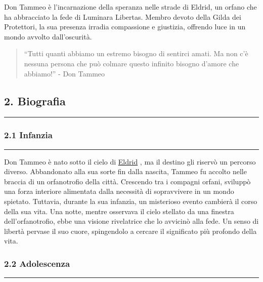 Don Tammeo è l'incarnazione della speranza nelle strade di Eldrid, un
orfano che ha abbracciato la fede di Luminara Libertas. Membro devoto
della Gilda dei Protettori, la sua presenza irradia compassione e
giustizia, offrendo luce in un mondo avvolto dall'oscurità.

\begin{quote}
``Tutti quanti abbiamo un estremo bisogno di sentirci amati. Ma non c'è
nessuna persona che può colmare questo infinito bisogno d'amore che
abbiamo!'' - Don Tammeo
\end{quote}

\subsection{2. Biografia}\label{biografia}

\begin{center}\rule{0.5\linewidth}{0.5pt}\end{center}

\subsubsection{\texorpdfstring{2.1
\textbf{Infanzia}}{2.1 Infanzia}}\label{infanzia}

\begin{center}\rule{0.5\linewidth}{0.5pt}\end{center}

Don Tammeo è nato sotto il cielo di
\href{Eldrid\%20bd820bb9f6164b39ae6e611a94748518.md}{Eldrid} , ma il
destino gli riservò un percorso diverso. Abbandonato alla sua sorte fin
dalla nascita, Tammeo fu accolto nelle braccia di un orfanotrofio della
città. Crescendo tra i compagni orfani, sviluppò una forza interiore
alimentata dalla necessità di sopravvivere in un mondo spietato.
Tuttavia, durante la sua infanzia, un misterioso evento cambierà il
corso della sua vita. Una notte, mentre osservava il cielo stellato da
una finestra dell'orfanotrofio, ebbe una visione rivelatrice che lo
avvicinò alla fede. Un senso di libertà pervase il suo cuore,
spingendolo a cercare il significato più profondo della vita.

\subsubsection{\texorpdfstring{2.2
\textbf{Adolescenza}}{2.2 Adolescenza}}\label{adolescenza}

\begin{center}\rule{0.5\linewidth}{0.5pt}\end{center}


